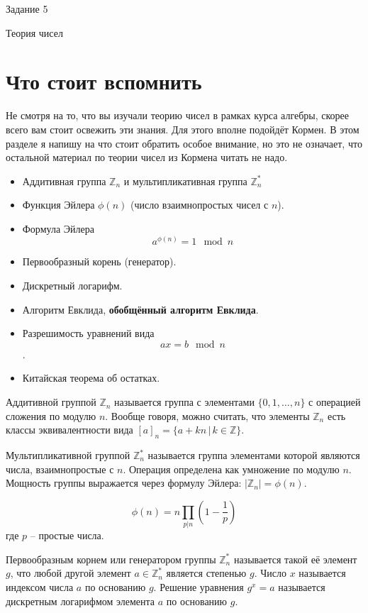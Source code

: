 \documentclass[12pt, leqno]{article}
\theoremstyle{definiton}
\theoremstyle{definition}
\theoremstyle{definition}
\def\ZZ{\mathbb Z}
\begin{document}
\centerline{\LARGE Задание 5}

\medskip

\begin{center}
	{\Large Теория чисел }
\end{center}

\bigskip


\section{Что стоит вспомнить}
	Не смотря на то, что вы изучали теорию чисел в рамках курса алгебры, скорее всего вам стоит освежить эти знания. Для этого вполне подойдёт Кормен. В этом разделе я напишу на что стоит обратить особое внимание, но это не означает, что остальной материал по теории чисел из Кормена читать не надо.
	\begin{itemize}
		\item Аддитивная группа $\ZZ_n$ и мультипликативная группа $\ZZ^*_{n}$
		\item Функция Эйлера $\phi(n)$ (число взаимнопростых чисел с $n$).
		\item Формула Эйлера $$a^{\phi(n)} = 1 \mod n$$
		\item Первообразный корень (генератор).
		\item Дискретный логарифм.
		\item Алгоритм Евклида, \textbf{обобщённый алгоритм Евклида}.
		\item Разрешимость уравнений вида $$ax = b \mod n$$.
		\item Китайская теорема об остатках.
		
	\end{itemize}
	
Аддитивной группой $\ZZ_n$ называется группа с элементами $\{0, 1, \ldots, n\}$ с операцией сложения по модулю $n$. Вообще говоря, можно считать, что элементы $\ZZ_n$ есть классы эквивалентности вида $[a]_n = \{ a+kn\,|\, k \in \ZZ \}$.

Мультипликативной группой $\ZZ_n^*$ называется группа элементами которой являются числа, взаимнопростые с $n$. Операция определена как умножение по модулю $n$. Мощность группы выражается через формулу Эйлера: $|\ZZ_n| = \phi(n) $.

$$ \phi(n) = n\prod_{p | n}(1 - \frac1p) $$
где $p$ -- простые числа.

Первообразным корнем или генератором группы $\ZZ_n^*$ называется такой её элемент $g$, что любой другой элемент $a \in \ZZ_n^*$ является степенью $g$. Число $x$ называется индексом числа $a$ по основанию $g$. Решение уравнения $g^x = a$ называется дискретным логарифмом элемента $a$ по основанию $g$.
\end{document}
